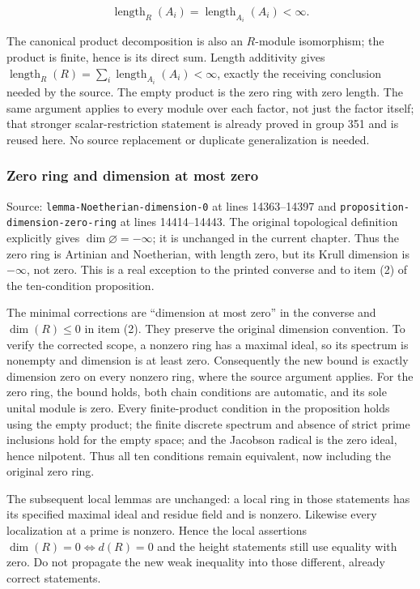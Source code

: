 \[
\operatorname{length}_R(A_i)=\operatorname{length}_{A_i}(A_i)<\infty.
\]

The canonical product decomposition is also an \(R\)-module isomorphism; the product is finite, hence is its direct sum. Length additivity gives \(\operatorname{length}_R(R)=\sum_i\operatorname{length}_{A_i}(A_i)<\infty\), exactly the receiving conclusion needed by the source. The empty product is the zero ring with zero length. The same argument applies to every module over each factor, not just the factor itself; that stronger scalar-restriction statement is already proved in group 351 and is reused here. No source replacement or duplicate generalization is needed.

\subsubsection{Zero ring and dimension at most zero}\label{zero-ring-and-dimension-at-most-zero}

Source: \texttt{lemma-Noetherian-dimension-0} at lines 14363--14397 and \texttt{proposition-dimension-zero-ring} at lines 14414--14443. The original topological definition explicitly gives \(\dim\varnothing=-\infty\); it is unchanged in the current chapter. Thus the zero ring is Artinian and Noetherian, with length zero, but its Krull dimension is \(-\infty\), not zero. This is a real exception to the printed converse and to item (2) of the ten-condition proposition.

The minimal corrections are ``dimension at most zero'' in the converse and \(\dim(R)\leq0\) in item (2). They preserve the original dimension convention. To verify the corrected scope, a nonzero ring has a maximal ideal, so its spectrum is nonempty and dimension is at least zero. Consequently the new bound is exactly dimension zero on every nonzero ring, where the source argument applies. For the zero ring, the bound holds, both chain conditions are automatic, and its sole unital module is zero. Every finite-product condition in the proposition holds using the empty product; the finite discrete spectrum and absence of strict prime inclusions hold for the empty space; and the Jacobson radical is the zero ideal, hence nilpotent. Thus all ten conditions remain equivalent, now including the original zero ring.

The subsequent local lemmas are unchanged: a local ring in those statements has its specified maximal ideal and residue field and is nonzero. Likewise every localization at a prime is nonzero. Hence the local assertions \(\dim(R)=0\iff d(R)=0\) and the height statements still use equality with zero. Do not propagate the new weak inequality into those different, already correct statements.


